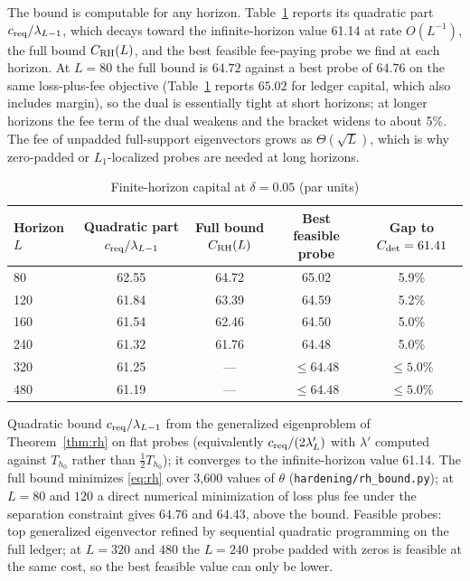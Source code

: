 \documentclass[12pt]{article}
\theoremstyle{definition}
\theoremstyle{remark}
\begin{document}
The bound is computable for any horizon. Table~\ref{tab:rh} reports its quadratic part $c_{\rm req}/\lambda_{L-1}$, which decays toward the infinite-horizon value 61.14 at rate $O(L^{-1})$, the full bound $C_{\rm RH}(L)$, and the best feasible fee-paying probe we find at each horizon. At $L=80$ the full bound is $64.72$ against a best probe of $64.76$ on the same loss-plus-fee objective (Table~\ref{tab:rh} reports $65.02$ for ledger capital, which also includes margin), so the dual is essentially tight at short horizons; at longer horizons the fee term of the dual weakens and the bracket widens to about 5\%. The fee of unpadded full-support eigenvectors grows as $\Theta(\sqrt L)$, which is why zero-padded or $L_1$-localized probes are needed at long horizons.

\begin{table}[t]\centering\small
\begin{threeparttable}
\caption{Finite-horizon capital at $\delta=0.05$ (par units)}\label{tab:rh}
\setlength{\tabcolsep}{4pt}
\begin{tabular}{lcccc}
\toprule
Horizon $L$ & Quadratic part $c_{\rm req}/\lambda_{L-1}$ & Full bound $C_{\rm RH}(L)$ & Best feasible probe & Gap to $C_{\rm det}=61.41$\\
\midrule
80 & 62.55 & 64.72 & 65.02 & 5.9\%\\
120 & 61.84 & 63.39 & 64.59 & 5.2\%\\
160 & 61.54 & 62.46 & 64.50 & 5.0\%\\
240 & 61.32 & 61.76 & 64.48 & 5.0\%\\
320 & 61.25 & --- & $\le64.48$ & $\le5.0\%$\\
480 & 61.19 & --- & $\le64.48$ & $\le5.0\%$\\
\bottomrule
\end{tabular}
\begin{tablenotes}\footnotesize\item Quadratic bound $c_{\rm req}/\lambda_{L-1}$ from the generalized eigenproblem of Theorem~\ref{thm:rh} on flat probes (equivalently $c_{\rm req}/(2\lambda'_L)$ with $\lambda'$ computed against $T_{h_0}$ rather than $\tfrac12T_{h_0}$); it converges to the infinite-horizon value 61.14. The full bound minimizes \eqref{eq:rh} over 3{,}600 values of $\theta$ (\texttt{hardening/rh\_bound.py}); at $L=80$ and $120$ a direct numerical minimization of loss plus fee under the separation constraint gives $64.76$ and $64.43$, above the bound. Feasible probes: top generalized eigenvector refined by sequential quadratic programming on the full ledger; at $L=320$ and $480$ the $L=240$ probe padded with zeros is feasible at the same cost, so the best feasible value can only be lower. \end{tablenotes}
\end{threeparttable}
\end{table}
\end{document}
